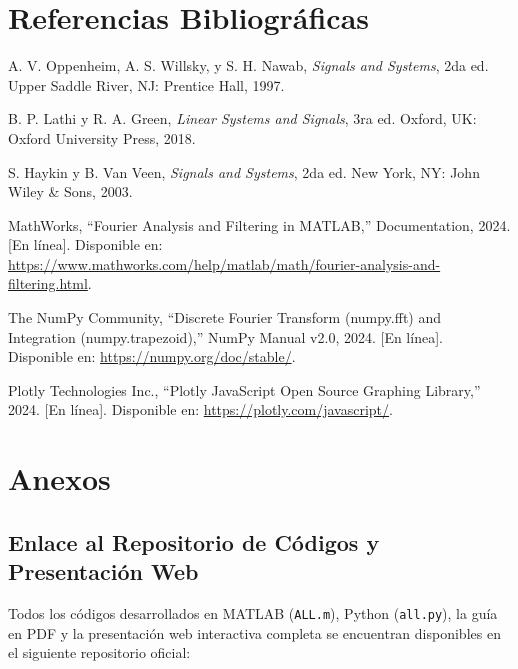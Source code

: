 \documentclass[11pt,a4paper]{article}
\begin{document}
\section{Referencias Bibliográficas}
\begin{enumerate}[leftmargin=*,label={[\arabic*]}]
    \item A. V. Oppenheim, A. S. Willsky, y S. H. Nawab, \textit{Signals and Systems}, 2da ed. Upper Saddle River, NJ: Prentice Hall, 1997.
    \item B. P. Lathi y R. A. Green, \textit{Linear Systems and Signals}, 3ra ed. Oxford, UK: Oxford University Press, 2018.
    \item S. Haykin y B. Van Veen, \textit{Signals and Systems}, 2da ed. New York, NY: John Wiley \& Sons, 2003.
    \item MathWorks, ``Fourier Analysis and Filtering in MATLAB,'' Documentation, 2024. [En línea]. Disponible en: \url{https://www.mathworks.com/help/matlab/math/fourier-analysis-and-filtering.html}.
    \item The NumPy Community, ``Discrete Fourier Transform (numpy.fft) and Integration (numpy.trapezoid),'' NumPy Manual v2.0, 2024. [En línea]. Disponible en: \url{https://numpy.org/doc/stable/}.
    \item Plotly Technologies Inc., ``Plotly JavaScript Open Source Graphing Library,'' 2024. [En línea]. Disponible en: \url{https://plotly.com/javascript/}.
\end{enumerate}

\newpage
\section{Anexos}

\subsection{Enlace al Repositorio de Códigos y Presentación Web}
Todos los códigos desarrollados en MATLAB (\texttt{ALL.m}), Python (\texttt{all.py}), la guía en PDF y la presentación web interactiva completa se encuentran disponibles en el siguiente repositorio oficial:
\end{document}

